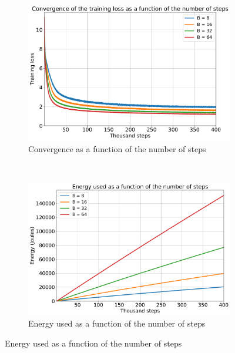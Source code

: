 \documentclass{article}
\begin{document}
{        \begin{figure}[!t]
            \centering
            \begin{subfigure}[b]{0.47 \textwidth}
                \includegraphics[trim = {0.0in 0.0in 0.0in 0.0in}, clip, width = 1.0 \textwidth]{../Figures/convergence_history_training.pdf}
                \caption{Convergence as a function of the number of steps}
                \label{fig:convergence_accuracy_training}
            \end{subfigure}
            ~
            \begin{subfigure}[b]{0.47 \textwidth}
                \includegraphics[trim = {0.0in 0.01in 0.0in 0.0in}, clip, width = 1.025 \textwidth]{../Figures/energy_history_training.pdf}
                \caption{Energy used as a function of the number of steps}

\end{subfigure}
\end{figure}}
\end{document}
